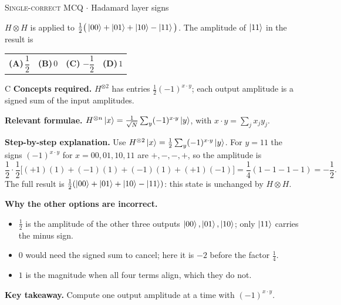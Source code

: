 \documentclass[11pt,a4paper]{article}
\newcommand{\optlabel}[1]{\textbf{(#1)}}
\newcommand{\correctlabel}[1]{\textcolor{okgreen}{\textbf{(#1)}\,\ding{51}}}
\newenvironment{qitem}[1]{\begin{list}{}{\setlength{\leftmargin}{3.3em}\setlength{\labelwidth}{3.1em}%
  \setlength{\labelsep}{0.2em}\setlength{\topsep}{3pt}\setlength{\parsep}{3pt}}\item[\textbf{Q.#1}\hfill]}{\end{list}}
\newcommand{\qsep}{\par\vspace{2pt}{\color{black!15}\hrule}\vspace{4pt}}
\newcommand{\qmeta}[2]{{\footnotesize\color{black!60}\textsc{#1} \;$\cdot$\; #2}\par}
\begin{document}
\begin{qitem}{23}
\qmeta{Single-correct MCQ}{Hadamard layer signs}
$H \otimes H$ is applied to $\frac12\big(\ket{00} + \ket{01} + \ket{10} - \ket{11}\big)$. The amplitude of $\ket{11}$ in the result is
\par\smallskip\noindent\begin{tabularx}{\linewidth}{@{}*{4}{L}@{}}
\optlabel{A}\,$\dfrac12$ & \optlabel{B}\,$0$ & \correctlabel{C}\,$-\dfrac12$ & \optlabel{D}\,$1$
\end{tabularx}
\end{qitem}
\begin{solbox}{C}
\textbf{\color{brand}Concepts required.} $H^{\otimes2}$ has entries $\frac12(-1)^{x\cdot y}$; each output amplitude is a signed sum of the input amplitudes.

\textbf{\color{brand}Relevant formulae.} $H^{\otimes n}\ket{x} = \frac{1}{\sqrt N}\sum_y(-1)^{x\cdot y}\ket{y}$, with $x\cdot y = \sum_jx_jy_j$.

\textbf{\color{brand}Step-by-step explanation.} Use $H^{\otimes2}\ket{x} = \frac12\sum_y(-1)^{x\cdot y}\ket{y}$. For $y = 11$ the signs $(-1)^{x\cdot y}$ for $x = 00, 01, 10, 11$ are $+, -, -, +$, so the amplitude is
\[ \frac12\cdot\frac12\big[(+1)(1) + (-1)(1) + (-1)(1) + (+1)(-1)\big] = \frac14(1 - 1 - 1 - 1) = -\frac12. \]
The full result is $\frac12(\ket{00} + \ket{01} + \ket{10} - \ket{11})$: this state is unchanged by $H \otimes H$.

\textbf{\color{brand}Why the other options are incorrect.}
\begin{itemize}[leftmargin=2.4em, itemsep=1pt, topsep=2pt]
\item[\textbf{(A)}] $\frac12$ is the amplitude of the other three outputs $\ket{00}, \ket{01}, \ket{10}$; only $\ket{11}$ carries the minus sign.
\item[\textbf{(B)}] $0$ would need the signed sum to cancel; here it is $-2$ before the factor $\frac14$.
\item[\textbf{(D)}] $1$ is the magnitude when all four terms align, which they do not.
\end{itemize}
\textbf{\color{brand}Key takeaway.} Compute one output amplitude at a time with $(-1)^{x\cdot y}$.
\end{solbox}
\qsep
\end{document}

